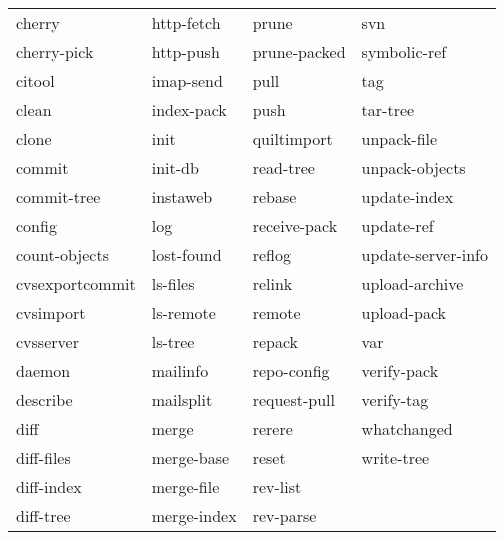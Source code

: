 \documentclass[english]{beamer}
\begin{document}
\begin{frame}[fragile]
{\begin{tabular}{llll}
cherry            & http-fetch        & prune          & svn                \\
cherry-pick       & http-push         & prune-packed   & symbolic-ref       \\
citool            & imap-send         & pull           & tag                \\
clean             & index-pack        & push           & tar-tree           \\
clone             & init              & quiltimport    & unpack-file        \\
commit            & init-db           & read-tree      & unpack-objects     \\
commit-tree       & instaweb          & rebase         & update-index       \\
config            & log               & receive-pack   & update-ref         \\
count-objects     & lost-found        & reflog         & update-server-info \\
cvsexportcommit   & ls-files          & relink         & upload-archive     \\
cvsimport         & ls-remote         & remote         & upload-pack        \\
cvsserver         & ls-tree           & repack         & var                \\
daemon            & mailinfo          & repo-config    & verify-pack        \\
describe          & mailsplit         & request-pull   & verify-tag         \\
diff              & merge             & rerere         & whatchanged        \\
diff-files        & merge-base        & reset          & write-tree         \\
diff-index        & merge-file        & rev-list       &                    \\
diff-tree         & merge-index       & rev-parse      &                    \\
\end{tabular}
}
\end{frame}
\end{document}
